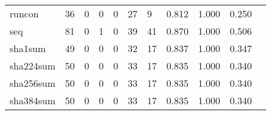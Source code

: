 \begin{longtable}{lp{1.20cm}p{1.20cm}p{1.20cm}p{1.20cm}p{1.20cm}p{1.20cm}p{1.20cm}p{1.20cm}p{1.20cm}p{1.20cm}}
runcon    &                                    36 &                                                  0 &                                                  0 &                                                  0 &                                                 27 &                                                  9 &                                         0.812 &                                              1.000 &                                              0.250 \\
seq       &                                    81 &                                                  0 &                                                  1 &                                                  0 &                                                 39 &                                                 41 &                                         0.870 &                                              1.000 &                                              0.506 \\
sha1sum   &                                    49 &                                                  0 &                                                  0 &                                                  0 &                                                 32 &                                                 17 &                                         0.837 &                                              1.000 &                                              0.347 \\
sha224sum &                                    50 &                                                  0 &                                                  0 &                                                  0 &                                                 33 &                                                 17 &                                         0.835 &                                              1.000 &                                              0.340 \\
sha256sum &                                    50 &                                                  0 &                                                  0 &                                                  0 &                                                 33 &                                                 17 &                                         0.835 &                                              1.000 &                                              0.340 \\
sha384sum &                                    50 &                                                  0 &                                                  0 &                                                  0 &                                                 33 &                                                 17 &                                         0.835 &                                              1.000 &                                              0.340 \\

\end{longtable}
